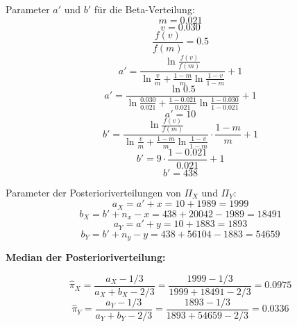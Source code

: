 \documentclass[a4paper,12pt]{article}
\begin{document}
Parameter $a'$ und $b'$ für die Beta-Verteilung:\\
\begin{equation}
  m = 0.021
\end{equation}
\begin{equation}
  v = 0.030
\end{equation}
\begin{equation}
  \frac{f(v)}{f(m)} = 0.5
\end{equation}
\begin{equation}
  a' = \frac{\ln\frac{f(v)}{f(m)}}{\ln\frac{v}{m}+\frac{1-m}{m}\ln\frac{1-v}{1-m}} + 1
\end{equation}
\begin{equation}
  a' = \frac{\ln0.5}{\ln\frac{0.030}{0.021}+\frac{1-0.021}{0.021}\ln\frac{1-0.030}{1-0.021}} + 1
\end{equation}
\begin{equation}
  a' = 10
\end{equation}
\begin{equation}
  b' = \frac{\ln\frac{f(v)}{f(m)}}{\ln\frac{v}{m}+\frac{1-m}{m}\ln\frac{1-v}{1-m}}\cdot\frac{1-m}{m} + 1
\end{equation}
\begin{equation}
  b' = 9 \cdot \frac{1-0.021}{0.021} + 1
\end{equation}
\begin{equation}
  b' = 438
\end{equation}

Parameter der Posterioriverteilungen von $\Pi_X$ und $\Pi_Y$:
\begin{equation}
  a_X = a' + x = 10 + 1989 = 1999
\end{equation}
\begin{equation}
  b_X = b' + n_x - x = 438 + 20042 - 1989 = 18491
\end{equation}
\begin{equation}
  a_Y = a' + y = 10 + 1883 = 1893
\end{equation}
\begin{equation}
  b_Y = b' + n_y - y = 438 + 56104 - 1883 = 54659
\end{equation}

\textbf{Median der Posterioriverteilung:}

\begin{equation}
  \hat{\pi}_X = \frac{a_X - 1/3}{a_X + b_X - 2/3} = \frac{1999 - 1/3}{1999 + 18491 - 2/3} = 0.0975
\end{equation}
\begin{equation}
  \hat{\pi}_Y = \frac{a_Y - 1/3}{a_Y + b_Y - 2/3} = \frac{1893 - 1/3}{1893 + 54659 - 2/3} = 0.0336
\end{equation}
\end{document}
